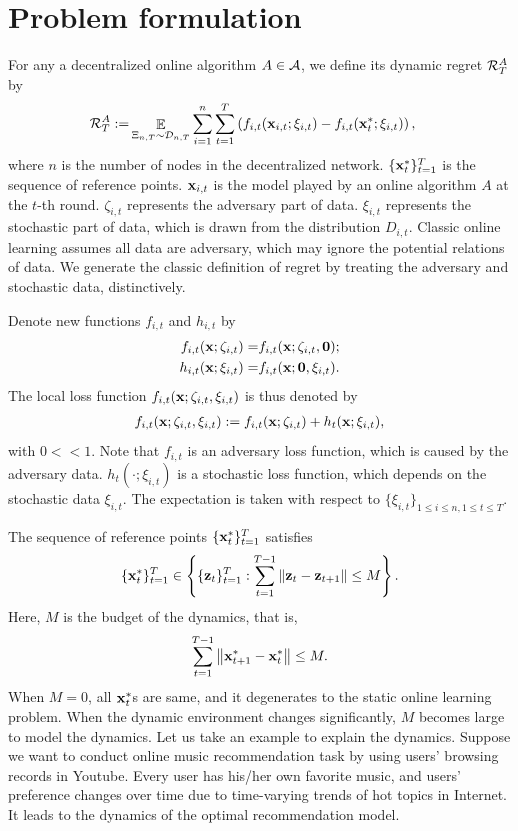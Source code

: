 \documentclass{article}
\begin{document}
\section{Problem formulation}


For any a decentralized online algorithm $A \in {\mathcal{A}}$, we define its dynamic regret ${\mathcal{R}}_T^{A}$ by
\begin{align}
\label{equa_definition_our_regret}
{\mathcal{R}}_T^{A} := & \mathop{\mathbb{E}}_{ \Xi_{n,T} \sim \mathcal{D}_{n,T} }  \sum_{i=1}^n\sum_{t=1}^T \left( f_{i,t}({\bf x}_{i,t};\xi_{i,t}) - f_{i,t}({\bf x}_t^\ast;\xi_{i,t})  \right),
\end{align} where $n$ is the number of nodes in the decentralized network. $\{{\bf x}_t^\ast\}_{t=1}^T$ is the sequence of reference points. ${\bf x}_{i,t}$ is the model played by an online algorithm $A$ at the $t$-th round. $\zeta_{i,t}$ represents the adversary part of data. $\xi_{i,t}$ represents the stochastic part of data, which is drawn from the distribution $D_{i,t}$. Classic online learning assumes all data are adversary, which may ignore the potential relations of data. We generate the classic definition of regret by treating the adversary and stochastic data, distinctively.


Denote new functions $f_{i,t}$ and $h_{i,t}$ by 
\begin{align}
\nonumber
f_{i,t}({\bf x};\zeta_{i,t}) = & f_{i,t}({\bf x};\zeta_{i,t},{\bf 0}); \\ \nonumber
h_{i,t}({\bf x};\xi_{i,t}) = & f_{i,t}({\bf x};{\bf 0},\xi_{i,t}).
\end{align} The local loss function $f_{i,t}({\bf x};\zeta_{i,t},\xi_{i,t})$ is thus denoted by
\begin{align}
\nonumber
f_{i,t}({\bf x};\zeta_{i,t},\xi_{i,t}) :=   f_{i,t}({\bf x};\zeta_{i,t}) +   h_t({\bf x}; \xi_{i,t}), 
\end{align} with $0< <1$.   Note that $f_{i,t}$ is an adversary loss function, which is caused by the adversary data. $h_t(\cdot; \xi_{i,t})$ is a stochastic loss function, which depends on the stochastic data $\xi_{i,t}$. The expectation is taken with respect to $\{\xi_{i,t}\}_{1\le i\le n,1\le t\le T}$. 

The sequence of reference points $\{{\bf x}_t^\ast\}_{t=1}^T$ satisfies 
\begin{align}
\nonumber
\{{\bf x}_t^\ast\}_{t=1}^T \in \left\{ \{{\bf z}_t\}_{t=1}^{T} : \sum_{t=1}^{T-1} \left\lVert{\bf z}_t - {\bf z}_{t+1}\right\rVert \le M \right\}.
\end{align} Here, $M$ is the budget of the dynamics, that is,
\begin{align}
\label{equa_define_M}
\sum_{t=1}^{T-1} \left\lVert{\bf x}_{t+1}^\ast - {\bf x}_t^\ast\right\rVert \le M.
\end{align} When $M=0$, all ${\bf x}_t^\ast$s are same, and it degenerates to the static online learning problem. When the dynamic environment changes significantly, $M$ becomes large to model the dynamics. Let us take an example to explain the dynamics. Suppose we want to conduct online music recommendation task by using users' browsing records in Youtube. Every user has his/her own favorite music, and users' preference  changes over time due to time-varying trends of hot topics in Internet. It leads to the dynamics of the optimal recommendation model.  
\end{document}

